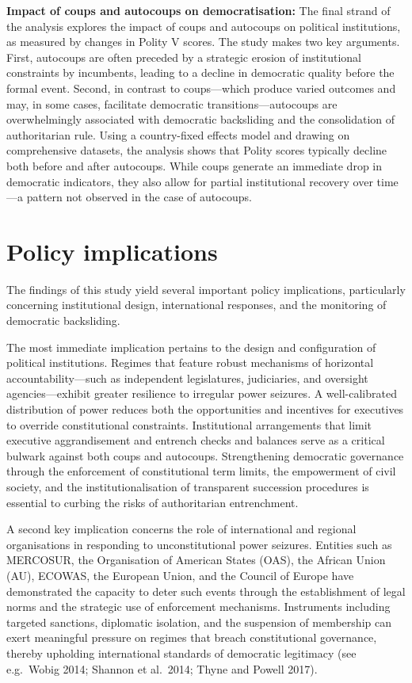 \documentclass[
  12pt,
]{report}
\begin{document}
\textbf{Impact of coups and autocoups on democratisation:} The final
strand of the analysis explores the impact of coups and autocoups on
political institutions, as measured by changes in Polity V scores. The
study makes two key arguments. First, autocoups are often preceded by a
strategic erosion of institutional constraints by incumbents, leading to
a decline in democratic quality before the formal event. Second, in
contrast to coups---which produce varied outcomes and may, in some
cases, facilitate democratic transitions---autocoups are overwhelmingly
associated with democratic backsliding and the consolidation of
authoritarian rule. Using a country-fixed effects model and drawing on
comprehensive datasets, the analysis shows that Polity scores typically
decline both before and after autocoups. While coups generate an
immediate drop in democratic indicators, they also allow for partial
institutional recovery over time---a pattern not observed in the case of
autocoups.

\section{Policy implications}\label{policy-implications-1}

The findings of this study yield several important policy implications,
particularly concerning institutional design, international responses,
and the monitoring of democratic backsliding.

The most immediate implication pertains to the design and configuration
of political institutions. Regimes that feature robust mechanisms of
horizontal accountability---such as independent legislatures,
judiciaries, and oversight agencies---exhibit greater resilience to
irregular power seizures. A well-calibrated distribution of power
reduces both the opportunities and incentives for executives to override
constitutional constraints. Institutional arrangements that limit
executive aggrandisement and entrench checks and balances serve as a
critical bulwark against both coups and autocoups. Strengthening
democratic governance through the enforcement of constitutional term
limits, the empowerment of civil society, and the institutionalisation
of transparent succession procedures is essential to curbing the risks
of authoritarian entrenchment.

A second key implication concerns the role of international and regional
organisations in responding to unconstitutional power seizures. Entities
such as MERCOSUR, the Organisation of American States (OAS), the African
Union (AU), ECOWAS, the European Union, and the Council of Europe have
demonstrated the capacity to deter such events through the establishment
of legal norms and the strategic use of enforcement mechanisms.
Instruments including targeted sanctions, diplomatic isolation, and the
suspension of membership can exert meaningful pressure on regimes that
breach constitutional governance, thereby upholding international
standards of democratic legitimacy (see e.g.~Wobig 2014; Shannon et
al.~2014; Thyne and Powell 2017).
\end{document}
